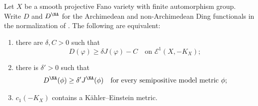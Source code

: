 \begin{theorem}\label{thm:ytd-fano-bridge}
Let $X$ be a smooth projective Fano variety with finite automorphism
group.  Write $D$ and $D^{\NA}$ for the Archimedean and
non-Archimedean Ding functionals in the normalization of \cite{BBJ21}.
The following are equivalent:
\begin{enumerate}
\item there are $\delta,C>0$ such that
      \[
             D(\varphi)\geq\delta J(\varphi)-C
             \quad\text{on }\mathcal E^1(X,-K_X);
      \]
\item there is $\delta'>0$ such that
      \[
             D^{\NA}(\phi)\geq\delta'J^{\NA}(\phi)
             \quad\text{for every semipositive model metric }\phi;
      \]
\item $c_1(-K_X)$ contains a K\"ahler--Einstein metric.
\end{enumerate}
\end{theorem}

